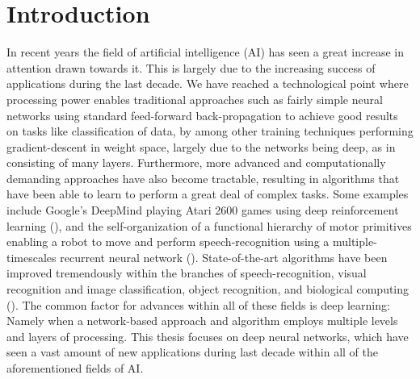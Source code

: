 
\chapter{Introduction}

In recent years the field of artificial intelligence (AI) has seen a great increase in attention drawn towards it. This is largely due to the increasing success of applications during the last decade. We have reached a technological point where processing power enables traditional approaches such as fairly simple neural networks using standard feed-forward back-propagation to achieve good results on tasks like classification of data, by among other training techniques performing gradient-descent in weight space, largely due to the networks being deep, as in consisting of many layers. Furthermore, more advanced and computationally demanding approaches have also become tractable, resulting in algorithms that have been able to learn to perform a great deal of complex tasks. Some examples include Google's DeepMind playing Atari 2600 games using deep reinforcement learning (\cite{Mnih2015}), and the self-organization of a functional hierarchy of motor primitives enabling a robot to move and perform speech-recognition using a multiple-timescales recurrent neural network (\cite{Tani2014}). State-of-the-art algorithms have been improved tremendously within the branches of speech-recognition, visual recognition and image classification, object recognition, and biological computing (\cite{LeCun2015}). The common factor for advances within all of these fields is deep learning: Namely when a network-based approach and algorithm employs multiple levels and layers of processing. This thesis focuses on deep neural networks, which have seen a vast amount of new applications during last decade within all of the aforementioned fields of AI.
\\

